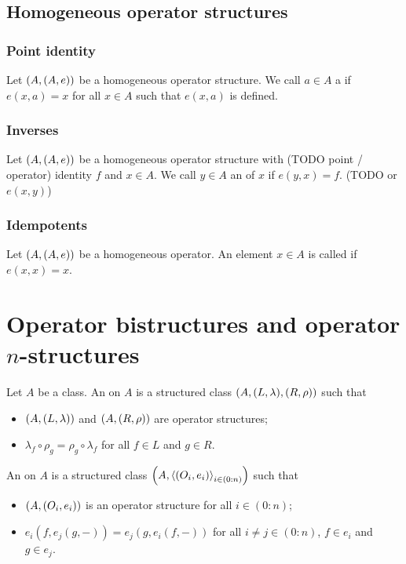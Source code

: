 \section{Homogeneous operator structures}
\subsection{Point identity}
\begin{definition}
Let $\left( A, (A, e) \right)$ be a homogeneous operator structure. We call $a\in A$ a  if $e(x,a) = x$ for all $x\in A$ such that $e(x,a)$ is defined.
\end{definition}

\subsection{Inverses}
\begin{definition}
Let $\left( A, (A, e) \right)$ be a homogeneous operator structure with (TODO point / operator) identity $f$ and $x\in A$. We call $y\in A$ an  of $x$ if $e(y,x) = f$. (TODO or $e(x,y)$)
\end{definition}

\subsection{Idempotents}
\begin{definition}
Let $\left( A, (A, e) \right)$ be a homogeneous operator. An element $x\in A$ is called  if $e(x,x) = x$.
\end{definition}

\chapter{Operator bistructures and operator $n$-structures}
\begin{definition}
Let $A$ be a class. An  on $A$ is a structured class $\left( A, (L, \lambda), (R,\rho) \right)$ such that
\begin{itemize}
\item $\left( A, (L, \lambda) \right)$ and $\left( A, (R,\rho) \right)$ are operator structures;
\item $\lambda_f \circ \rho_g = \rho_g\circ \lambda_f$ for all $f\in L$ and $g\in R$.
\end{itemize}
An  on $A$ is a structured class $\left( A, \left\langle (O_i, e_i) \right\rangle_{i\in(0:n)} \right)$ such that
\begin{itemize}
\item $\left( A, (O_i, e_i) \right)$ is an operator structure for all $i\in (0:n)$;
\item $e_i(f,e_j(g,-)) = e_j(g,e_i(f,-))$ for all $i\neq j\in (0:n)$, $f\in e_i$ and $g\in e_j$.
\end{itemize}
\end{definition}

